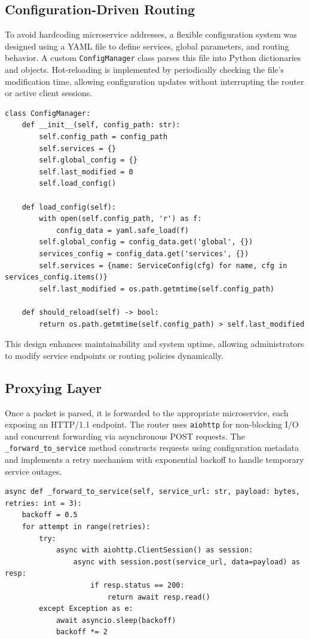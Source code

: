 \subsection{Configuration-Driven Routing}
To avoid hardcoding microservice addresses, a flexible configuration system was designed using a YAML file to define services, global parameters, and routing behavior. A custom \texttt{ConfigManager} class parses this file into Python dictionaries and objects. Hot-reloading is implemented by periodically checking the file’s modification time, allowing configuration updates without interrupting the router or active client sessions.

\begin{lstlisting}[breaklines=true,basicstyle=\small\ttfamily,frame=single]
class ConfigManager:
    def __init__(self, config_path: str):
        self.config_path = config_path
        self.services = {}
        self.global_config = {}
        self.last_modified = 0
        self.load_config()

    def load_config(self):
        with open(self.config_path, 'r') as f:
            config_data = yaml.safe_load(f)
        self.global_config = config_data.get('global', {})
        services_config = config_data.get('services', {})
        self.services = {name: ServiceConfig(cfg) for name, cfg in services_config.items()}
        self.last_modified = os.path.getmtime(self.config_path)

    def should_reload(self) -> bool:
        return os.path.getmtime(self.config_path) > self.last_modified
\end{lstlisting}

This design enhances maintainability and system uptime, allowing administrators to modify service endpoints or routing policies dynamically.

\subsection{Proxying Layer}
Once a packet is parsed, it is forwarded to the appropriate microservice, each exposing an HTTP/1.1 endpoint. The router uses \texttt{aiohttp} for non-blocking I/O and concurrent forwarding via asynchronous POST requests. The \texttt{\_forward\_to\_service} method constructs requests using configuration metadata and implements a retry mechanism with exponential backoff to handle temporary service outages.

\begin{lstlisting}[breaklines=true,basicstyle=\small\ttfamily,frame=single]
async def _forward_to_service(self, service_url: str, payload: bytes, retries: int = 3):
    backoff = 0.5
    for attempt in range(retries):
        try:
            async with aiohttp.ClientSession() as session:
                async with session.post(service_url, data=payload) as resp:
                    if resp.status == 200:
                        return await resp.read()
        except Exception as e:
            await asyncio.sleep(backoff)
            backoff *= 2
\end{lstlisting}

